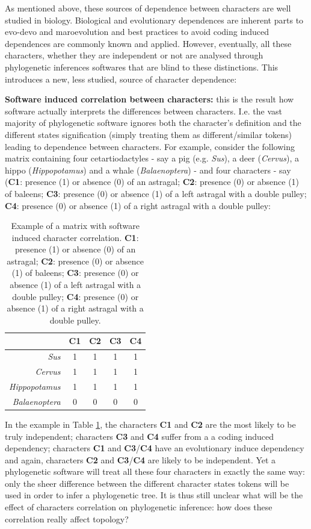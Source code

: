 \documentclass[12pt,letterpaper]{article}
\begin{document}
As mentioned above, these sources of dependence between characters are well studied in biology.
Biological and evolutionary dependences are inherent parts to evo-devo and maroevolution and best practices to avoid coding induced dependences are commonly known and applied.
However, eventually, all these characters, whether they are independent or not are analysed through phylogenetic inferences softwares that are blind to these distinctions.
This introduces a new, less studied, source of character dependence:

\noindent \textbf{Software induced correlation between characters:} this is the result how software actually interprets the differences between characters.
I.e. the vast majority of phylogenetic software ignores both the character's definition and the different states signification (simply treating them as different/similar tokens) leading to dependence between characters.
For example, consider the following matrix containing four cetartiodactyles - say a pig (e.g. \textit{Sus}), a deer (\textit{Cervus}), a hippo (\textit{Hippopotamus}) and a whale (\textit{Balaenoptera}) - and four characters - say (\textbf{C1}: presence (1) or absence (0) of an astragal; \textbf{C2}: presence (0) or absence (1) of baleens; \textbf{C3}: presence (0) or absence (1) of a left astragal with a double pulley; \textbf{C4}: presence (0) or absence (1) of a right astragal with a double pulley:

\begin{table}
\center
    \begin{tabular}{r|cccc}
            & C1 & C2 & C3 & C4\\
        \hline
        \textit{Sus} & 1 & 1 & 1 & 1\\
        \textit{Cervus} & 1 & 1 & 1 & 1\\
        \textit{Hippopotamus} & 1 & 1 & 1 & 1\\
        \textit{Balaenoptera} & 0 & 0 & 0 & 0\\
    \end{tabular}
    \caption{Example of a matrix with software induced character correlation. \textbf{C1}: presence (1) or absence (0) of an astragal; \textbf{C2}: presence (0) or absence (1) of baleens; \textbf{C3}: presence (0) or absence (1) of a left astragal with a double pulley; \textbf{C4}: presence (0) or absence (1) of a right astragal with a double pulley.}
    \label{Tab:example_matrix}
\end{table}

In the example in Table \ref{Tab:example_matrix}, the characters \textbf{C1} and \textbf{C2} are the most likely to be truly independent; characters \textbf{C3} and \textbf{C4} suffer from a a coding induced dependency; characters \textbf{C1} and \textbf{C3}/\textbf{C4} have an evolutionary induce dependency and again, characters \textbf{C2} and \textbf{C3}/\textbf{C4} are likely to be independent.
Yet a phylogenetic software will treat all these four characters in exactly the same way: only the sheer difference between the different character states tokens will be used in order to infer a phylogenetic tree.
It is thus still unclear what will be the effect of characters correlation on phylogenetic inference: how does these correlation really affect topology?
\end{document}
